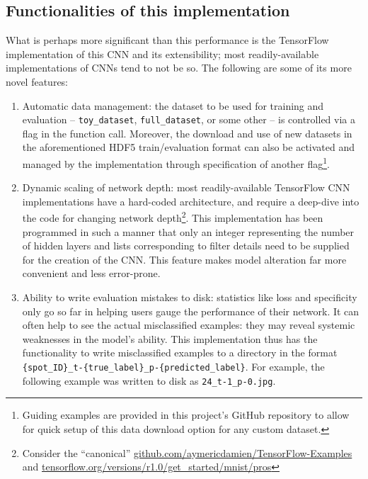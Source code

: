 \documentclass[a4paper, 11pt]{article} %
\begin{document}
	\subsection{Functionalities of this implementation}
		What is perhaps more significant than this performance is the 
		TensorFlow implementation 
		of 
		this CNN and its
		extensibility; most readily-available implementations of CNNs tend to 
		not be so. The following are some of its more novel features:
		\begin{enumerate}
			\item Automatic data management: the dataset to be used for 
			training and evaluation -- \texttt{toy\_dataset}, 
			\texttt{full\_dataset}, or some other -- is controlled via a flag 
			in 
			the function call. Moreover, the download and use of new datasets 
			in the aforementioned HDF5 train/evaluation format can also be 
			activated and managed by the implementation through 
			specification of another flag\footnote{Guiding examples are 
			provided in this project's GitHub repository to allow for quick 
			setup of this 
			data download option for any custom dataset.}.
			\item Dynamic scaling of network depth: most readily-available 
			TensorFlow CNN implementations have a hard-coded architecture, and 
			require a deep-dive into the code for changing network 
			depth\footnote{Consider the ``canonical''
			\hyperlink{https://github.com/aymericdamien/TensorFlow-Examples}
			{github.com/aymericdamien/TensorFlow-Examples} and 
			\hyperlink{https://www.tensorflow.org/versions/r1.0/get\_started/mnist/pros}
			{tensorflow.org/versions/r1.0/get\_started/mnist/pros}}. This 
			implementation has been programmed in such a manner 
			that only an integer representing the number of hidden layers and 
			lists corresponding to filter details need
			to be supplied for the creation of the CNN. This feature makes 
			model alteration far more convenient and less error-prone.
			\item Ability to write evaluation mistakes to disk: statistics like 
			loss and specificity only go so far in helping users gauge the 
			performance of their network. It can often help to see the actual 
			misclassified examples: they may reveal systemic weaknesses in the 
			model's ability. This implementation thus has the functionality to 
			write misclassified examples to a directory in the format 
			\texttt{\{spot\_ID\}\_t-\{true\_label\}\_p-\{predicted\_label\}}.
			For example, the following example was written to disk as
			\texttt{24\_t-1\_p-0.jpg}.

\end{enumerate}
\end{document}
